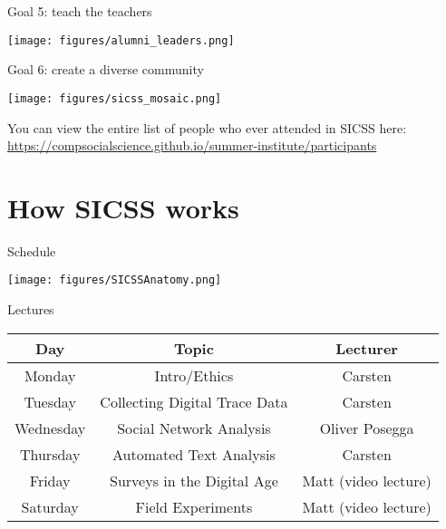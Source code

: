 \documentclass{beamer}
\def\vf{\vfill}
\begin{document}
\begin{frame}{Goal 5: teach the teachers}

\begin{center}
\texttt{[image: figures/alumni\_leaders.png]}
\end{center}

\end{frame}

\begin{frame}{Goal 6: create a diverse community}

\begin{center}
\texttt{[image: figures/sicss\_mosaic.png]}
\end{center}

\vf
You can view the entire list of people who ever attended in SICSS here: \\ \small{\url{https://compsocialscience.github.io/summer-institute/participants}}

\end{frame}

\section{How SICSS works}

\begin{frame}{Schedule}

\begin{center}
\texttt{[image: figures/SICSSAnatomy.png]}
\end{center}

\end{frame}


\begin{frame}{Lectures}

\begin{center}
\begin{tabular}{ c|c|c } 
\hline
\textbf{Day} & \textbf{Topic} & \textbf{Lecturer} \\
\hline
Monday & Intro/Ethics & Carsten \\ 
Tuesday & Collecting Digital Trace Data & Carsten \\ 
Wednesday & Social Network Analysis & Oliver Posegga\\ 
Thursday & Automated Text Analysis & Carsten \\ 
Friday & Surveys in the Digital Age & Matt (video lecture)\\ 
Saturday & Field Experiments & Matt (video lecture)\\ 

\hline
\end{tabular}
\end{center}

\end{frame}
\end{document}
